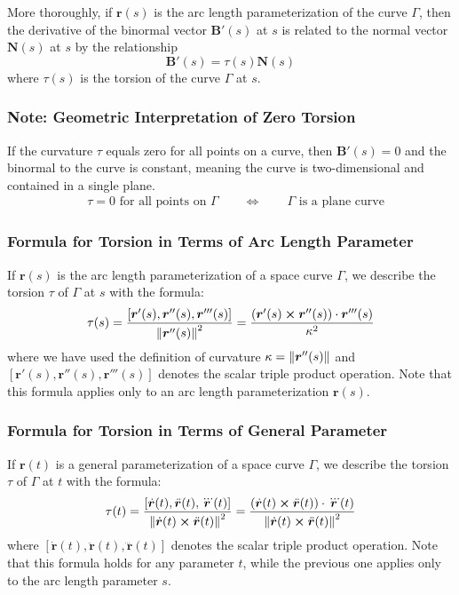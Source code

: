 \documentclass[11pt, a4paper]{article}
\begin{document}
More thoroughly, if $ \bm{r}(s) $ is the arc length parameterization of the curve $ \Gamma $, then the derivative of the binormal vector $\mathbf{B}'(s) $ at $ s $ is related to the normal vector $ \mathbf{N}(s) $ at $ s $ by the relationship
\begin{equation*}
	\mathbf{B}'(s) = \tau(s) \mathbf{N}(s)
\end{equation*}
where $ \tau (s) $ is the torsion of the curve $ \Gamma $ at $ s $.
	
\subsubsection{Note: Geometric Interpretation of Zero Torsion}
If the curvature $ \tau $ equals zero for all points on a curve, then $  \mathbf{B}'(s) = 0  $ and the binormal to the curve is constant, meaning the curve is two-dimensional and contained in a single plane. 
\begin{align*}
	& \tau = 0 \text{ for all points on } \Gamma \qquad \iff \qquad \Gamma \text{ is a plane curve}
\end{align*}

\subsubsection{Formula for Torsion in Terms of Arc Length Parameter}
If $ \bm{r}(s) $ is the arc length parameterization of a space curve $ \Gamma $, we describe the torsion $ \tau $ of $ \Gamma $ at $ s $ with the formula:
\begin{equation*}
	\tau(s) = \frac{\left[\bm{r}'(s), \bm{r}''(s), \bm{r}'''(s)\right] }{\norm{\bm{r}''(s)}^2} = \frac{\left(\bm{r}'(s) \cross \bm{r}''(s)\right) \cdot \bm{r}'''(s)}{\kappa^2} 
\end{equation*}
where we have used the definition of curvature $ \kappa = \norm{\bm{r}''(s)} $ and $ \left[\bm{r}'(s), \bm{r}''(s), \bm{r}'''(s)\right]  $ denotes the scalar triple product operation. Note that this formula applies only to an arc length parameterization $ \bm{r}(s) $.

\subsubsection{Formula for Torsion in Terms of General Parameter}
If $ \bm{r}(t) $ is a general parameterization of a space curve $ \Gamma $, we describe the torsion $ \tau $ of $ \Gamma $ at $ t $ with the formula:
\begin{equation*}
	\tau(t) = \frac{\left[\dot{\bm{r}}(t), \ddot{\bm{r}}(t), \dddot{\bm{r}}(t)\right]}{\norm{\dot{\bm{r}}(t) \cross \ddot{\bm{r}}(t)}^2} = \frac{\left(\dot{\bm{r}}(t) \cross \ddot{\bm{r}}(t)\right) \cdot \dddot{\bm{r}}(t)}{\norm{\dot{\bm{r}}(t) \cross \ddot{\bm{r}}(t)}^2}
\end{equation*}
where $ \left[\dot{\bm{r}}(t), \ddot{\bm{r}}(t), \dddot{\bm{r}}(t)\right] $ denotes the scalar triple product operation. Note that this formula holds for any parameter $ t $, while the previous one applies only to the arc length parameter $ s $.
\end{document}
